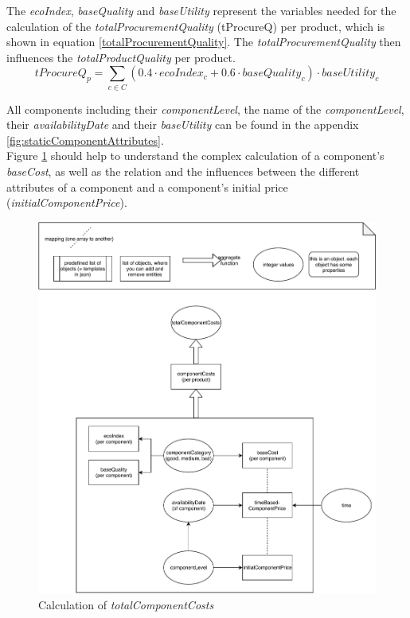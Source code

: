 The \textit{ecoIndex}, \textit{baseQuality} and \textit{baseUtility} represent the variables needed for the calculation of the \textit{totalProcurementQuality} (\gls{tProcureQ}) per product, which is shown in equation \ref{totalProcurementQuality}. The \textit{totalProcurementQuality} then influences the \textit{totalProductQuality} per product.
\begin{equation}
\label{totalProcurementQuality}
    tProcureQ_{p}= \sum_{c \in C} (0.4 \cdot ecoIndex_{c} + 0.6 \cdot baseQuality_{c}) \cdot baseUtility_{c}
\end{equation}

All components including their \textit{componentLevel}, the name of the \textit{componentLevel}, their \textit{availabilityDate} and their \textit{baseUtility} can be found in the appendix \ref{fig:staticComponentAttributes}.\\
Figure \ref{img:totalComponentCosts} should help to understand the complex calculation of a component's \textit{baseCost}, as well as the relation and the influences between the different attributes of a component and a component’s initial price (\textit{initialComponentPrice}).

\begin{figure} [!htbp]
	\centering
	\includegraphics[width=11.5cm]{images/totalComponentCosts.pdf}
	\caption{Calculation of \textit{totalComponentCosts}}
	\label{img:totalComponentCosts}
\end{figure}

